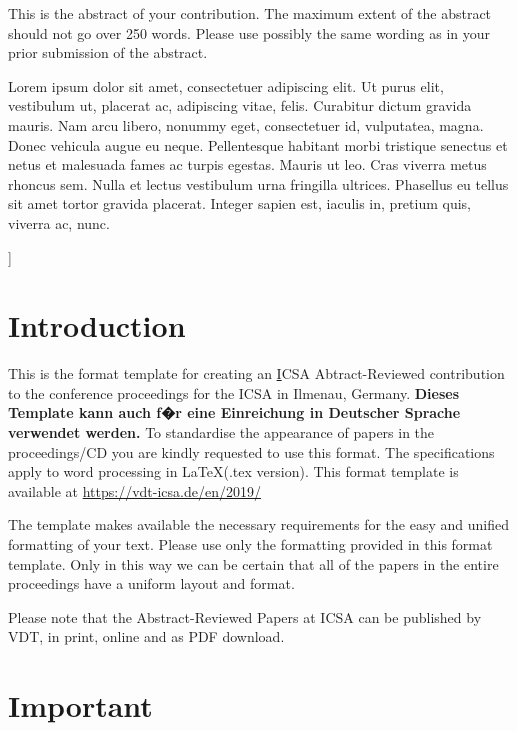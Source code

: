 \documentclass[a4paper, 10pt, twocolumn]{article}
\begin{document}
{\vspace{-3mm}}
\begin{onecolabstract}
{\vspace{3mm}}

This is the abstract of your contribution. The maximum extent of the abstract should not go over 250 words. Please use possibly the same wording as in your prior submission of the abstract. 

Lorem ipsum dolor sit amet, consectetuer adipiscing elit. Ut purus elit, vestibulum ut, placerat ac, adipiscing vitae, felis. Curabitur dictum gravida mauris. Nam arcu libero, nonummy eget, consectetuer id, vulputatea, magna. Donec vehicula augue eu neque. Pellentesque habitant morbi tristique senectus et netus et malesuada fames ac turpis egestas. Mauris ut leo. Cras viverra metus rhoncus sem. Nulla et lectus vestibulum urna fringilla ultrices. Phasellus eu tellus sit amet tortor gravida placerat. Integer sapien est, iaculis in, pretium quis, viverra ac, nunc. 

\end{onecolabstract}
{\vspace{8mm}}]

\section{Introduction} \label{sec:introduction}


This is the format template for creating an {\underline ICSA Abtract-Reviewed contribution} to the conference proceedings for the ICSA in Ilmenau, Germany. \textbf{Dieses Template kann auch f�r eine Einreichung in Deutscher Sprache verwendet werden.} To standardise the appearance of papers in the proceedings/CD you are kindly requested to use this format. The specifications apply to word processing in \LaTeX (.tex version). This format template is available at \textcolor{blue}{\url{https://vdt-icsa.de/en/2019/}}

The template makes available the necessary requirements for the easy and unified formatting of your text. Please use only the formatting provided in this format template. Only in this way we can be certain that all of the papers in the entire proceedings have a uniform layout and format.

Please note that the Abstract-Reviewed Papers at ICSA can be published by VDT, in print, online and as PDF download.

\section{Important} \label{sec:Important}
\end{document}
